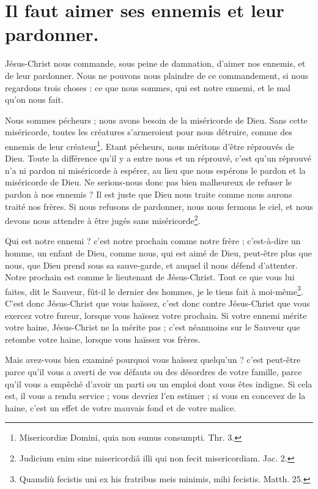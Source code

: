 \documentclass[instructions.tex]{subfiles}
\begin{document}
 
\chapter{Il faut aimer ses ennemis et leur pardonner.}
 
Jésus-Christ nous commande, sous peine de damnation, d’aimer nos ennemis, et de leur pardonner. Nous ne pouvons nous plaindre de ce commandement, si nous regardons trois choses : ce que nous sommes, qui est notre ennemi, et le mal qu’on nous fait.
 
\primo Nous sommes pécheurs ; nous avons besoin de la miséricorde de Dieu. Sans cette miséricorde, toutes les créatures s’armeroient pour nous détruire, comme des ennemis de leur créateur\footnote{Misericordiæ Domini, quia non sumus consumpti. Thr. 3.}. Etant pécheurs, nous méritons d’être réprouvés de Dieu. Toute la différence qu’il y a entre nous et un réprouvé, c’est qu’un réprouvé n’a ni pardon ni miséricorde à espérer, au lieu que nous espérons le pardon et la miséricorde de Dieu. Ne serions-nous donc pas bien malheureux de refuser le pardon à nos ennemis ? Il est juste que Dieu nous traite comme nous aurons traité nos frères. Si nous refusons de pardonner, nous nous fermons le ciel, et nous devons nous attendre à être jugés sans miséricorde\footnote{Judicium enim sine misericordiâ illi qui non fecit misericordiam. Jac. 2.}.
 
\secundo Qui est notre ennemi ? c’est notre prochain comme notre frère ; c’est-à-dire un homme, un enfant de Dieu, comme nous, qui est aimé de Dieu, peut-être plus que nous, que Dieu prend sous sa sauve-garde, et auquel il nous défend d’attenter. Notre prochain est comme le lieutenant de Jésus-Christ. Tout ce que vous lui faites, dit le Sauveur, fût-il le dernier des hommes, je le tiens fait à moi-même\footnote{Quamdiù fecistis uni ex his fratribus meis minimis, mihi fecistis. Matth. 25.}. C’est donc Jésus-Christ que vous haïssez, c’est donc contre Jésus-Christ que vous exercez votre fureur, lorsque vous haïssez votre prochain. Si votre ennemi mérite votre haine, Jésus-Christ ne la mérite pas ; c’est néanmoins sur le Sauveur que retombe votre haine, lorsque vous haïssez vos frères.
 
\tertio Mais avez-vous bien examiné pourquoi vous haïssez quelqu’un ? c’est peut-être parce qu’il vous a averti de vos défauts ou des désordres de votre famille, parce qu’il vous a empêché d’avoir un parti ou un emploi dont vous êtes indigne. Si cela est, il vous a rendu service ; vous devriez l’en estimer ; si vous en concevez de la haine, c’est un effet de votre mauvais fond et de votre malice.
 
\end{document}
